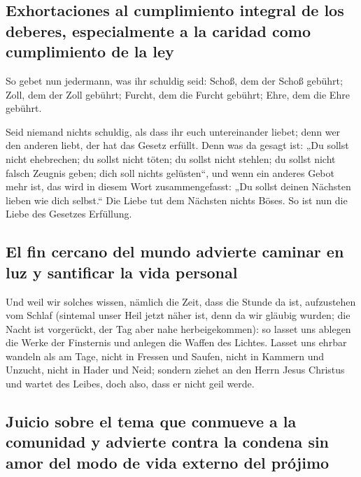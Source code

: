 \hypertarget{exhortaciones-al-cumplimiento-integral-de-los-deberes-especialmente-a-la-caridad-como-cumplimiento-de-la-ley}{%
\subsection{Exhortaciones al cumplimiento integral de los deberes,
especialmente a la caridad como cumplimiento de la
ley}\label{exhortaciones-al-cumplimiento-integral-de-los-deberes-especialmente-a-la-caridad-como-cumplimiento-de-la-ley}}

 So gebet nun jedermann, was ihr schuldig seid: Schoß, dem
der Schoß gebührt; Zoll, dem der Zoll gebührt; Furcht, dem die Furcht
gebührt; Ehre, dem die Ehre gebührt.

 Seid niemand nichts schuldig, als dass ihr euch
untereinander liebet; denn wer den anderen liebt, der hat das Gesetz
erfüllt.  Denn was da gesagt ist: „Du sollst nicht
ehebrechen; du sollst nicht töten; du sollst nicht stehlen; du sollst
nicht falsch Zeugnis geben; dich soll nichts gelüsten``, und wenn ein
anderes Gebot mehr ist, das wird in diesem Wort zusammengefasst: „Du
sollst deinen Nächsten lieben wie dich selbst.``  Die
Liebe tut dem Nächsten nichts Böses. So ist nun die Liebe des Gesetzes
Erfüllung.

\hypertarget{el-fin-cercano-del-mundo-advierte-caminar-en-luz-y-santificar-la-vida-personal}{%
\subsection{El fin cercano del mundo advierte caminar en luz y
santificar la vida
personal}\label{el-fin-cercano-del-mundo-advierte-caminar-en-luz-y-santificar-la-vida-personal}}

 Und weil wir solches wissen, nämlich die Zeit, dass die
Stunde da ist, aufzustehen vom Schlaf (sintemal unser Heil jetzt näher
ist, denn da wir gläubig wurden;  die Nacht ist
vorgerückt, der Tag aber nahe herbeigekommen): so lasset uns ablegen die
Werke der Finsternis und anlegen die Waffen des Lichtes. 
Lasset uns ehrbar wandeln als am Tage, nicht in Fressen und Saufen,
nicht in Kammern und Unzucht, nicht in Hader und Neid; 
sondern ziehet an den Herrn Jesus Christus und wartet des Leibes, doch
also, dass er nicht geil werde.

\hypertarget{juicio-sobre-el-tema-que-conmueve-a-la-comunidad-y-advierte-contra-la-condena-sin-amor-del-modo-de-vida-externo-del-pruxf3jimo}{%
\subsection{Juicio sobre el tema que conmueve a la comunidad y advierte
contra la condena sin amor del modo de vida externo del
prójimo}\label{juicio-sobre-el-tema-que-conmueve-a-la-comunidad-y-advierte-contra-la-condena-sin-amor-del-modo-de-vida-externo-del-pruxf3jimo}}

